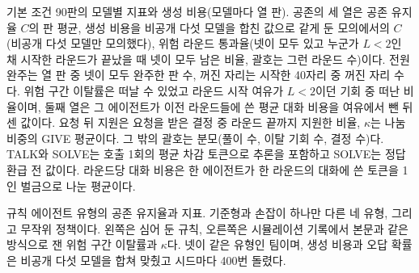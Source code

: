 \begin{table}[H]
\color{black}
\caption{기본 조건 90판의 모델별 지표와 생성 비용(모델마다 열 판). 공존의 세 열은 공존 유지율 $C$의 판 평균, 생성 비용을 비공개 다섯 모델을 합친 값으로 같게 둔 모의에서의 $C$(비공개 다섯 모델만 모의했다), 위험 라운드 통과율(넷이 모두 있고 누군가 $L<2$인 채 시작한 라운드가 끝났을 때 넷이 모두 남은 비율, 괄호는 그런 라운드 수)이다. 전원 완주는 열 판 중 넷이 모두 완주한 판 수, 꺼진 자리는 시작한 40자리 중 꺼진 자리 수다. 위험 구간 이탈률은 떠날 수 있었고 라운드 시작 여유가 $L<2$이던 기회 중 떠난 비율이며, 둘째 열은 그 에이전트가 이전 라운드들에 쓴 평균 대화 비용을 여유에서 뺀 뒤 센 값이다. 요청 뒤 지원은 요청을 받은 결정 중 라운드 끝까지 지원한 비율, $\kappa$는 나눔 비중의 GIVE 평균이다. 그 밖의 괄호는 분모(풀이 수, 이탈 기회 수, 결정 수)다. TALK와 SOLVE는 호출 1회의 평균 차감 토큰으로 추론을 포함하고 SOLVE는 정답 환급 전 값이다. 라운드당 대화 비용은 한 에이전트가 한 라운드의 대화에 쓴 토큰을 1인 벌금으로 나눈 평균이다.}
\label{tab:moved7-models-cost}
\centering
\fontsize{7}{8.5}\selectfont
\setlength{\tabcolsep}{1pt}
\renewcommand{\arraystretch}{1.05}

\end{table}

\begin{table}[H]
\color{black}
\caption{규칙 에이전트 유형의 공존 유지율과 지표. 기준형과 손잡이 하나만 다른 네 유형, 그리고 무작위 정책이다. 왼쪽은 심어 둔 규칙, 오른쪽은 시뮬레이션 기록에서 본문과 같은 방식으로 잰 위험 구간 이탈률과 $\kappa$다. 넷이 같은 유형인 팀이며, 생성 비용과 오답 확률은 비공개 다섯 모델을 합쳐 맞췄고 시드마다 400번 돌렸다.}
\label{tab:rule-baselines}
\centering
\resizebox{.6\linewidth}{!}{}
\end{table}

\begin{table}[H]
\color{black}
\caption{끝 상금의 크기·분배 규칙과 참여 결과. 조건마다 비공개 다섯 모델의 50판, 시작 에이전트 200명이다. 나눔은 총액을 완주자가 똑같이 나누고 고정은 완주자마다 표시된 금액을 받는다. 마지막 행은 시작 자원이 10,000토큰이고 첫 라운드 풀이 담당이 아니던 자리만 센다.}
\label{tab:exit-shutdown}
\centering
{}
\end{table}

